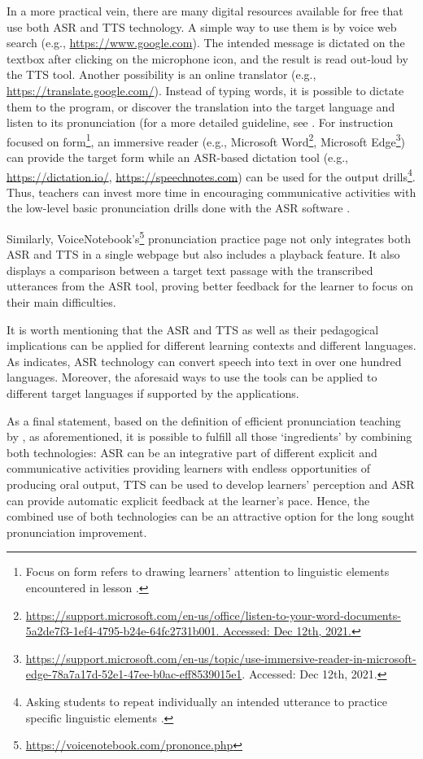 \documentclass[english]{textolivre}
\begin{document}
In a more practical vein, there are many digital resources available for free that use both ASR and TTS technology. A simple way to use them is by voice web search (e.g., \url{https://www.google.com}). The intended message is dictated on the textbox after clicking on the microphone icon, and the result is read out-loud by the TTS tool. Another possibility is an online translator (e.g., \url{https://translate.google.com/}). Instead of typing words, it is possible to dictate them to the program, or discover the translation into the target language and listen to its pronunciation (for a more detailed guideline, see \cite{carrier_automated_2017}. For instruction focused on form\footnote{Focus on form refers to drawing learners’ attention to linguistic elements encountered in lesson \cite{long_focus_1991}.}, an immersive reader (e.g., Microsoft Word\footnote{\url{https://support.microsoft.com/en-us/office/listen-to-your-word-documents-5a2de7f3-1ef4-4795-b24e-64fc2731b001. Accessed: Dec 12th, 2021.}}, Microsoft Edge\footnote{\url{https://support.microsoft.com/en-us/topic/use-immersive-reader-in-microsoft-edge-78a7a17d-52e1-47ee-b0ac-eff8539015e1}. Accessed: Dec 12th, 2021.}) can provide the target form while an ASR-based dictation tool (e.g., \url{https://dictation.io/}, \url{https://speechnotes.com}) can be used for the output drills\footnote{Asking students to repeat individually an intended utterance to practice specific linguistic elements \cite{harmer_essential_2012}.}. Thus, teachers can invest more time in encouraging communicative activities with the low-level basic pronunciation drills done with the ASR software \cite{kim_automatic_2006}.

Similarly, VoiceNotebook’s\footnote{\url{https://voicenotebook.com/prononce.php}} pronunciation practice page not only integrates both ASR and TTS in a single webpage but also includes a playback feature. It also displays a comparison between a target text passage with the transcribed utterances from the ASR tool, proving better feedback for the learner to focus on their main difficulties.

It is worth mentioning that the ASR and TTS as well as their pedagogical implications can be applied for different learning contexts and different languages. As \textcite{henrichsen_illustrated_2021} indicates, ASR technology can convert speech into text in over one hundred languages. Moreover, the aforesaid ways to use the tools can be applied to different target languages if supported by the applications.

As a final statement, based on the definition of efficient pronunciation teaching by \textcite{darcy_powerful_2018}, as aforementioned, it is possible to fulfill all those ‘ingredients’ by combining both technologies: ASR can be an integrative part of different explicit and communicative activities providing learners with endless opportunities of producing oral output, TTS can be used to develop learners' perception and ASR can provide automatic explicit feedback at the learner’s pace. Hence, the combined use of both technologies can be an attractive option for the long sought pronunciation improvement.
\end{document}
